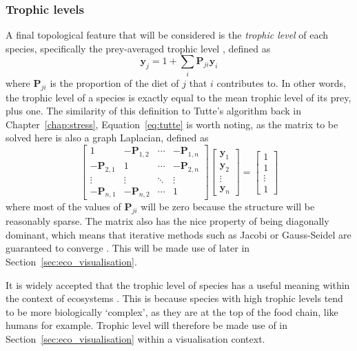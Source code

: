 \subsubsection{Trophic levels}
A final topological feature that will be considered is the \emph{trophic level} of each species, specifically the prey-averaged trophic level \citep{Williams2004}, defined as
\begin{equation}
  \mathbf{y}_j = 1 + \sum_i \mathbf{P}_{ji}\mathbf{y}_i
  \label{eq:trophic}
\end{equation}
where $\mathbf{P}_{ji}$ is the proportion of the diet of $j$ that $i$ contributes to.
In other words, the trophic level of a species is exactly equal to the mean trophic level of its prey, plus one.
The similarity of this definition to Tutte's algorithm back in Chapter~\ref{chap:stress}, Equation~\eqref{eq:tutte} is worth noting, as the matrix to be solved here is also a graph Laplacian, defined as
\begin{equation}
  \begin{bmatrix}
  1&-\mathbf{P}_{1,2}&\cdots&-\mathbf{P}_{1,n}\\
  -\mathbf{P}_{2,1}&1&\cdots&-\mathbf{P}_{2,n}\\
  \vdots&\vdots&\ddots&\vdots\\
  -\mathbf{P}_{n,1}&-\mathbf{P}_{n,2}&\cdots&1
  \end{bmatrix}
  \begin{bmatrix}
  \mathbf{y}_1\\\mathbf{y}_2\\\vdots\\\mathbf{y}_n
  \end{bmatrix}
  =
  \begin{bmatrix}
  1\\1\\\vdots\\1
  \end{bmatrix}
  \label{eq:trophic_matrix}
\end{equation}
where most of the values of $\mathbf{P}_{ji}$ will be zero because the structure will be reasonably sparse.
The matrix also has the nice property of being diagonally dominant, which means that iterative methods such as Jacobi or Gauss-Seidel are guaranteed to converge \citep{Young2014}. This will be made use of later in Section~\ref{sec:eco_visualisation}.

It is widely accepted that the trophic level of species has a useful meaning within the context of ecosystems \citep{Post2002, Johnson2014}. This is because species with high trophic levels tend to be more biologically `complex', as they are at the top of the food chain, like humans for example.
Trophic level will therefore be made use of in Section~\ref{sec:eco_visualisation} within a visualisation context.

